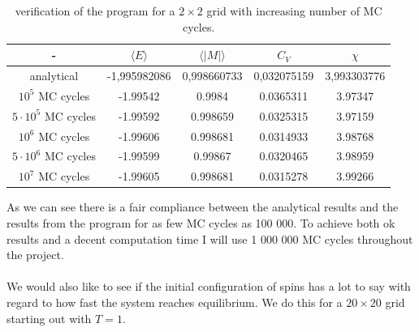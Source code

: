 \documentclass[a4paper,english, 10pt, twoside]{article}
\begin{document}
\begin{table}[H]
\centering
 \begin{tabular}{|c|c|c|c|c|}
 \hline
  - & $\langle E \rangle$ & $\langle |M|\rangle$ & $C_V$ & $\chi$  \\
\hline
  analytical & -1,995982086 & 0,998660733& 0,032075159& 3,993303776\\ \hline
  $10^5$ MC cycles & -1.99542 & 0.9984 & 0.0365311 & 3.97347\\ \hline
  $5\cdot10^5$ MC cycles & -1.99592 & 0.998659 & 0.0325315 & 3.97159\\ \hline
  $10^6$ MC cycles & -1.99606 & 0.998681 & 0.0314933 & 3.98768\\ \hline
   $5\cdot10^6$ MC cycles & -1.99599 & 0.99867  & 0.0320465 & 3.98959\\ \hline
   $10^7$ MC cycles & -1.99605 & 0.998681 & 0.0315278 & 3.99266\\ 
  \hline
 \end{tabular}
 \caption{verification of the program for a $2\times 2$ grid with increasing number of MC cycles.}
\label{table2}
\end{table}
As we can see there is a fair compliance between the analytical results and the results from the program for as few MC cycles as 
100 000. To achieve both ok results and a decent computation time I will use 1 000 000 MC cycles throughout the project.\\ \\
We would also like to see if the initial configuration of spins has a lot to say with regard to how fast the system reaches 
equilibrium. We do this for a $20 \times 20$ grid starting out with $T = 1$. 
\end{document}
